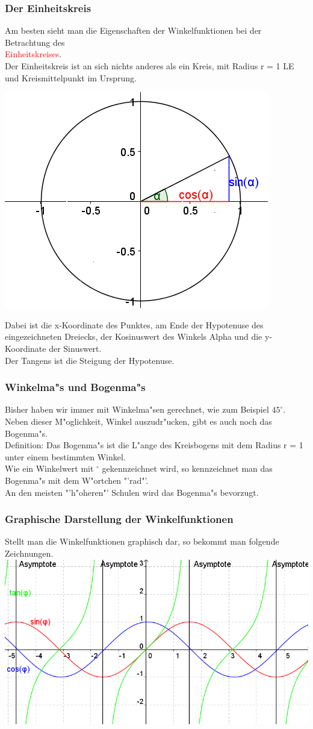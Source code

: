 \subsubsection{Der Einheitskreis}
\begin{minipage}{9 cm}
Am besten sieht man die Eigenschaften der Winkelfunktionen bei der Betrachtung des\\ \textcolor{red}{Einheitskreises}.\\
Der Einheitskreis ist an sich nichts anderes als ein Kreis, mit Radius r = 1 LE und Kreismittelpunkt im Ursprung.\\
\end{minipage}
\begin{minipage}{4 cm}
\includegraphics[width = 4 cm]{pictures/Einheitskreis}
\end{minipage}
Dabei ist die x-Koordinate des Punktes, am Ende der Hypotenuse des eingezeichneten Dreiecks, der Kosinuswert des Winkels Alpha und die y-Koordinate der Sinuswert.\\
Der Tangens ist die Steigung der Hypotenuse.


\subsubsection{Winkelma"s und Bogenma"s}
Bisher haben wir immer mit Winkelma"sen gerechnet, wie zum Beispiel $45^\circ$. Neben dieser M"oglichkeit, Winkel auszudr"ucken, gibt es auch noch das Bogenma"s.\\
Definition: Das Bogenma"s ist die L"ange des Kreisbogens mit dem Radius r = 1 unter einem bestimmten Winkel.\\
Wie ein Winkelwert mit $^\circ$ gekennzeichnet wird, so kennzeichnet man das Bogenma"s mit dem W"ortchen "'rad"'.\\
An den meisten "'h"oheren"' Schulen wird das Bogenma"s bevorzugt.
\subsubsection{Graphische Darstellung der Winkelfunktionen}
Stellt man die Winkelfunktionen graphisch dar, so bekommt man folgende Zeichnungen.\vspace{0.5 cm}\\
\includegraphics[width = 13 cm, height = 5 cm]{pictures/Winkelfunktionen}
